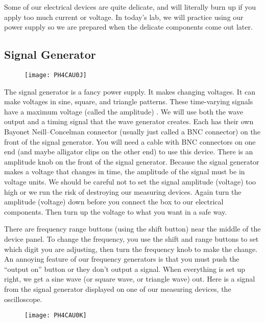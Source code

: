 Some of our electrical devices are quite delicate, and will literally burn up if you apply too much current or voltage. In today's lab, we will practice using our power supply so we are prepared when the delicate components come out later.

\subsection{Signal Generator}

\begin{figure}[h!]
	\centering
	\texttt{[image: PH4CAU0J]}
\end{figure}

The signal generator is a fancy power supply. It makes changing voltages. It can make voltages in sine, square, and triangle patterns. These time-varying signals have a maximum voltage (called the amplitude) . We will use both the wave output and a timing signal that the wave generator creates. Each has their own Bayonet Neill--Concelman connector (usually just called a BNC connector) on the
front of the signal generator. You will need a cable with BNC connectors on one end (and maybe alligator clips on the other end) to use this device. There is an amplitude knob on the front of the signal generator. Because the signal generator makes a voltage that changes in time, the amplitude of the signal must be in voltage units. We should be careful not to set the signal amplitude (voltage) too high or we run the risk of destroying our measuring devices. Again turn the amplitude (voltage) down before you connect the box to our electrical components. Then turn up the voltage to what you want in a safe way.

There are frequency range buttons (using the shift button) near the middle of the device panel. To change the frequency, you use the shift and range buttons to set which digit you are adjusting, then turn the frequency knob to make the change. An annoying feature of our frequency generators is that you must push the ``output on'' button or they don't output a signal. When everything is set up right, we get a sine wave (or square wave, or triangle wave) out. Here is a signal from the signal generator displayed on one of our measuring devices, the
oscilloscope. 

\begin{figure}[h!]
    \centering
    \texttt{[image: PH4CAU0K]}
\end{figure}

